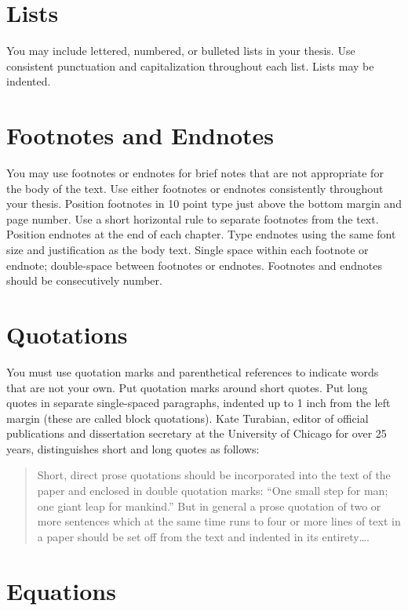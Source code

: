 \section{Lists}

You may include lettered, numbered, or bulleted lists in your thesis.
Use consistent punctuation and capitalization throughout each list.
Lists may be indented.

\section{Footnotes and Endnotes}

You may use footnotes or endnotes for brief notes that are not appropriate for
the body of the text.  Use either footnotes or endnotes consistently throughout
your thesis.  Position footnotes in 10 point type just above the bottom margin
and page number.  Use a short horizontal rule to separate footnotes from the
text.  Position endnotes at the end of each chapter.  Type endnotes using the
same font size and justification as the body text.  Single space within each
footnote or endnote; double-space between footnotes or endnotes.  Footnotes and
endnotes should be consecutively number.

\section{Quotations}

You must use quotation marks and parenthetical references to indicate words
that are not your own. Put quotation marks around short quotes.  Put long
quotes in separate single-spaced paragraphs, indented up to 1 inch from the
left margin (these are called block quotations).  Kate Turabian, editor of
official publications and dissertation secretary at the University of Chicago
for over 25 years, distinguishes short and long quotes as follows:

\begin{quote}
  Short, direct prose quotations should be incorporated into the text
  of the paper and enclosed in double quotation marks: ``One small step
  for man; one giant leap for mankind.'' But in general a prose
  quotation of two or more sentences which at the same time runs to
  four or more lines of text in a paper should be set off from the
  text and indented in its entirety\dots.~\cite{Turabian}
\end{quote}

\section{Equations}

